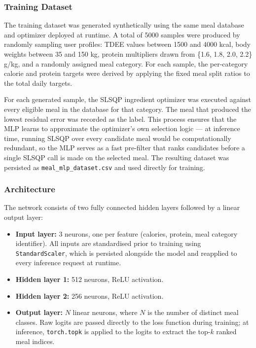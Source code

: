 \subsubsection{Training Dataset}

The training dataset was generated synthetically using the same meal database and
optimizer deployed at runtime. A total of 5000 samples were produced by randomly
sampling user profiles: TDEE values between 1500 and 4000 kcal, body weights between
35 and 150 kg, protein multipliers drawn from \{1.6, 1.8, 2.0, 2.2\} g/kg, and a
randomly assigned meal category. For each sample, the per-category calorie and protein
targets were derived by applying the fixed meal split ratios to the total daily targets.

For each generated sample, the SLSQP ingredient optimizer was executed against every
eligible meal in the database for that category. The meal that produced the lowest
residual error was recorded as the label. This process ensures that the MLP learns
to approximate the optimizer's own selection logic — at inference time, running SLSQP
over every candidate meal would be computationally redundant, so the MLP serves as a
fast pre-filter that ranks candidates before a single SLSQP call is made on the
selected meal. The resulting dataset was persisted as \texttt{meal\_mlp\_dataset.csv}
and used directly for training.

\subsubsection{Architecture}

The network consists of two fully connected hidden layers followed by a linear output
layer:

\begin{itemize}
    \item \textbf{Input layer:} 3 neurons, one per feature (calories, protein, meal
    category identifier). All inputs are standardised prior to training using
    \texttt{StandardScaler}, which is persisted alongside the model and reapplied to
    every inference request at runtime.
    \item \textbf{Hidden layer 1:} 512 neurons, ReLU activation.
    \item \textbf{Hidden layer 2:} 256 neurons, ReLU activation.
    \item \textbf{Output layer:} $N$ linear neurons, where $N$ is the number of
    distinct meal classes. Raw logits are passed directly to the loss function during
    training; at inference, \texttt{torch.topk} is applied to the logits to extract
    the top-$k$ ranked meal indices.
\end{itemize}

